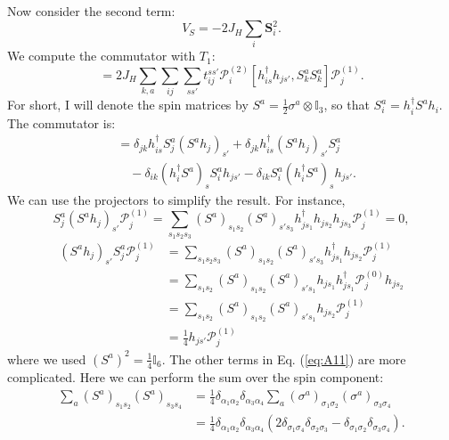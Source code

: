 \documentclass[11pt, a4paper]{article}
\begin{document}
Now consider the second term:
\begin{equation}
V_S = -2J_H \sum_i \bm{S}_i^2. \label{eq:A9}
\end{equation}
We compute the commutator with $T_1$:
\begin{equation}
[T_1, V_S] = 2J_H \sum_{k, a} \sum_{ij} \sum_{ss'} t_{ij}^{ss'} \mathcal{P}_i^{(2)} [h_{is}^{\dagger} h_{js'}, S_k^a S_k^a] \mathcal{P}_j^{(1)}. \label{eq:A10}
\end{equation}
For short, I will denote the spin matrices by $S^a = \frac{1}{2} \sigma^a \otimes \mathbb{I}_3$, so that $S_i^a = h_i^{\dagger} S^a h_i$. The commutator is:
\begin{align}
[h_{is}^{\dagger} h_{js'}, S_k^a S_k^a] &= \delta_{jk} h_{is}^{\dagger} S_j^a (S^a h_j)_{s'} + \delta_{jk} h_{is}^{\dagger} (S^a h_j)_{s'} S_j^a \nonumber \\
&\quad - \delta_{ik} (h_i^{\dagger} S^a)_s S_i^a h_{js'} - \delta_{ik} S_i^a (h_i^{\dagger} S^a)_s h_{js'}. \label{eq:A11}
\end{align}
We can use the projectors to simplify the result. For instance,
\begin{equation}
S_j^a (S^a h_j)_{s'} \mathcal{P}_j^{(1)} = \sum_{s_1 s_2 s_3} (S^a)_{s_1 s_2} (S^a)_{s' s_3} h_{js_1}^{\dagger} h_{js_2} h_{js_3} \mathcal{P}_j^{(1)} = 0, \label{eq:A12}
\end{equation}
\begin{align}
(S^a h_j)_{s'} S_j^a \mathcal{P}_j^{(1)} &= \sum_{s_1 s_2 s_3} (S^a)_{s_1 s_2} (S^a)_{s' s_3} h_{js_1}^{\dagger} h_{js_2} \mathcal{P}_j^{(1)} \nonumber \\
&= \sum_{s_1 s_2} (S^a)_{s_1 s_2} (S^a)_{s' s_1} h_{js_1} h_{js_1}^{\dagger} \mathcal{P}_j^{(0)} h_{js_2} \nonumber \\
&= \sum_{s_1 s_2} (S^a)_{s_1 s_2} (S^a)_{s' s_1} h_{js_2} \mathcal{P}_j^{(1)} \nonumber \\
&= \frac{1}{4} h_{js'} \mathcal{P}_j^{(1)} \label{eq:A13}
\end{align}
where we used $(S^a)^2 = \frac{1}{4} \mathbb{I}_6$. The other terms in Eq. (\ref{eq:A11}) are more complicated. Here we can perform the sum over the spin component:
\begin{align}
\sum_a (S^a)_{s_1 s_2} (S^a)_{s_3 s_4} &= \frac{1}{4} \delta_{\alpha_1 \alpha_2} \delta_{\alpha_3 \alpha_4} \sum_a (\sigma^a)_{\sigma_1 \sigma_2} (\sigma^a)_{\sigma_3 \sigma_4} \nonumber \\
&= \frac{1}{4} \delta_{\alpha_1 \alpha_2} \delta_{\alpha_3 \alpha_4} (2\delta_{\sigma_1 \sigma_4} \delta_{\sigma_2 \sigma_3} - \delta_{\sigma_1 \sigma_2} \delta_{\sigma_3 \sigma_4}). \label{eq:A14}
\end{align}
\end{document}
